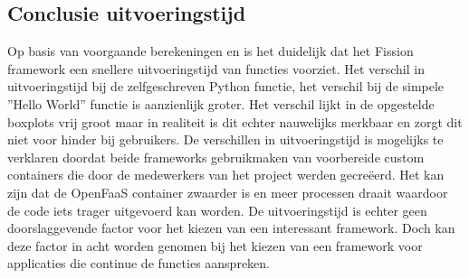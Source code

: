 \subsection{Conclusie uitvoeringstijd}
Op basis van voorgaande berekeningen en is het duidelijk dat het Fission framework een snellere uitvoeringstijd van functies voorziet. Het verschil in uitvoeringstijd bij de zelfgeschreven Python functie, het verschil bij de simpele ''Hello World'' functie is aanzienlijk groter. Het verschil lijkt in de opgestelde boxplots vrij groot maar in realiteit is dit echter nauwelijks merkbaar en zorgt dit niet voor hinder bij gebruikers. De verschillen in uitvoeringstijd is mogelijks te verklaren doordat beide frameworks gebruikmaken van voorbereide custom containers die door de medewerkers van het project werden gecreëerd. Het kan zijn dat de OpenFaaS container zwaarder is en meer processen draait waardoor de code iets trager uitgevoerd kan worden. De uitvoeringstijd is echter geen doorslaggevende factor voor het kiezen van een interessant framework. Doch kan deze factor in acht worden genomen bij het kiezen van een framework voor applicaties die continue de functies aanspreken.